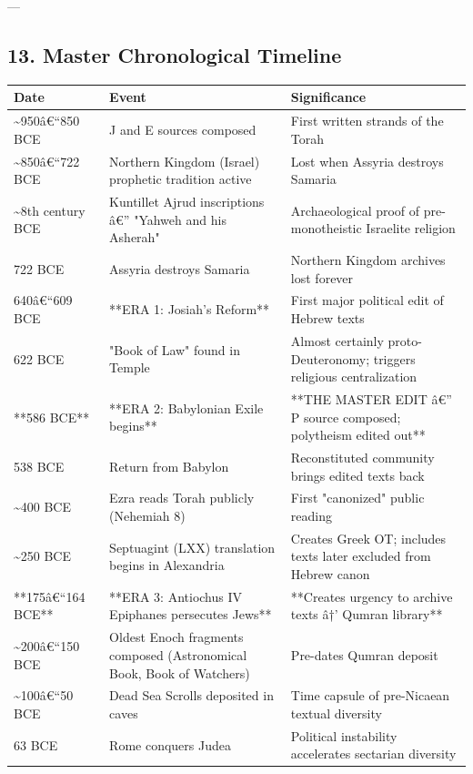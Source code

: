 \documentclass[aps,prd,11pt,onecolumn,superscriptaddress,nofootinbib,floatfix]{revtex4-2}
\begin{document}
---


\subsection{13. Master Chronological Timeline}


\begin{table}[h!]
\centering
\begin{tabular}{p{3cm}p{3cm}p{3cm}}
\hline
Date & Event & Significance \\
\hline
\textasciitilde{}950â€``850 BCE & J and E sources composed & First written strands of the Torah \\
\textasciitilde{}850â€``722 BCE & Northern Kingdom (Israel) prophetic tradition active & Lost when Assyria destroys Samaria \\
\textasciitilde{}8th century BCE & Kuntillet Ajrud inscriptions â€'' "Yahweh and his Asherah" & Archaeological proof of pre-monotheistic Israelite religion \\
722 BCE & Assyria destroys Samaria & Northern Kingdom archives lost forever \\
640â€``609 BCE & **ERA 1: Josiah's Reform** & First major political edit of Hebrew texts \\
622 BCE & "Book of Law" found in Temple & Almost certainly proto-Deuteronomy; triggers religious centralization \\
**586 BCE** & **ERA 2: Babylonian Exile begins** & **THE MASTER EDIT â€'' P source composed; polytheism edited out** \\
538 BCE & Return from Babylon & Reconstituted community brings edited texts back \\
\textasciitilde{}400 BCE & Ezra reads Torah publicly (Nehemiah 8) & First "canonized" public reading \\
\textasciitilde{}250 BCE & Septuagint (LXX) translation begins in Alexandria & Creates Greek OT; includes texts later excluded from Hebrew canon \\
**175â€``164 BCE** & **ERA 3: Antiochus IV Epiphanes persecutes Jews** & **Creates urgency to archive texts â†' Qumran library** \\
\textasciitilde{}200â€``150 BCE & Oldest Enoch fragments composed (Astronomical Book, Book of Watchers) & Pre-dates Qumran deposit \\
\textasciitilde{}100â€``50 BCE & Dead Sea Scrolls deposited in caves & Time capsule of pre-Nicaean textual diversity \\
63 BCE & Rome conquers Judea & Political instability accelerates sectarian diversity \\

\end{tabular}
\end{table}
\end{document}
